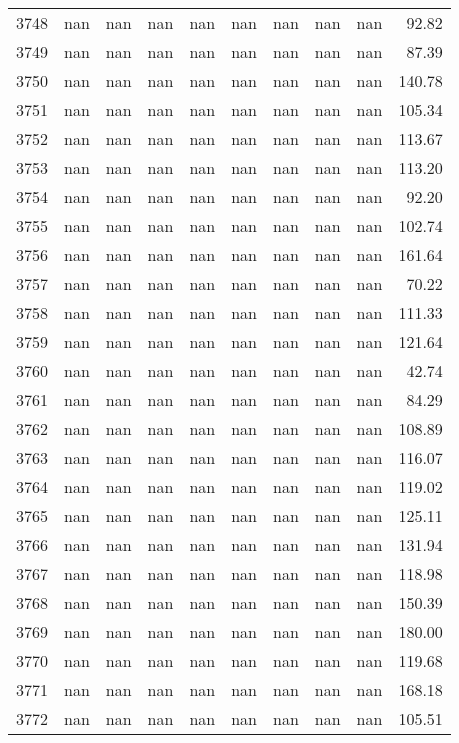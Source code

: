 \begin{tabular}{lrrrrrrrrr}
3748 & nan & nan & nan & nan & nan & nan & nan & nan & 92.82 \\
3749 & nan & nan & nan & nan & nan & nan & nan & nan & 87.39 \\
3750 & nan & nan & nan & nan & nan & nan & nan & nan & 140.78 \\
3751 & nan & nan & nan & nan & nan & nan & nan & nan & 105.34 \\
3752 & nan & nan & nan & nan & nan & nan & nan & nan & 113.67 \\
3753 & nan & nan & nan & nan & nan & nan & nan & nan & 113.20 \\
3754 & nan & nan & nan & nan & nan & nan & nan & nan & 92.20 \\
3755 & nan & nan & nan & nan & nan & nan & nan & nan & 102.74 \\
3756 & nan & nan & nan & nan & nan & nan & nan & nan & 161.64 \\
3757 & nan & nan & nan & nan & nan & nan & nan & nan & 70.22 \\
3758 & nan & nan & nan & nan & nan & nan & nan & nan & 111.33 \\
3759 & nan & nan & nan & nan & nan & nan & nan & nan & 121.64 \\
3760 & nan & nan & nan & nan & nan & nan & nan & nan & 42.74 \\
3761 & nan & nan & nan & nan & nan & nan & nan & nan & 84.29 \\
3762 & nan & nan & nan & nan & nan & nan & nan & nan & 108.89 \\
3763 & nan & nan & nan & nan & nan & nan & nan & nan & 116.07 \\
3764 & nan & nan & nan & nan & nan & nan & nan & nan & 119.02 \\
3765 & nan & nan & nan & nan & nan & nan & nan & nan & 125.11 \\
3766 & nan & nan & nan & nan & nan & nan & nan & nan & 131.94 \\
3767 & nan & nan & nan & nan & nan & nan & nan & nan & 118.98 \\
3768 & nan & nan & nan & nan & nan & nan & nan & nan & 150.39 \\
3769 & nan & nan & nan & nan & nan & nan & nan & nan & 180.00 \\
3770 & nan & nan & nan & nan & nan & nan & nan & nan & 119.68 \\
3771 & nan & nan & nan & nan & nan & nan & nan & nan & 168.18 \\
3772 & nan & nan & nan & nan & nan & nan & nan & nan & 105.51 \\

\end{tabular}
